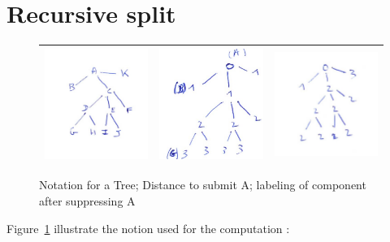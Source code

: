 \documentclass[a4paper]{article}
\begin{document}
\section{Recursive split}
\begin{figure}
\centering
\begin{tabular}{||c|c|c||}
 \hline \hline
\includegraphics[width=5cm]{FIGS/FTD-Tree.jpg} &
\includegraphics[width=5cm]{FIGS/FTD-Depth.jpg} &
\includegraphics[width=5cm]{FIGS/FTD-LabSplit.jpg}
 \\ \hline \hline
\end{tabular}
\caption{Notation for a Tree; Distance to submit A; labeling of component after suppressing A}
\label{TreeNotation}
\end{figure}

Figure~\ref{TreeNotation} illustrate the notion used for the computation :
\end{document}
